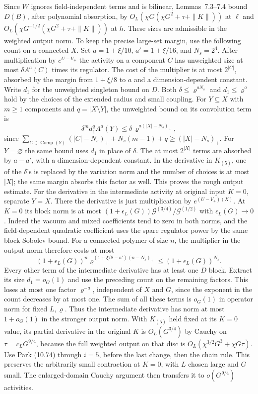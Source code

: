 \documentclass[11pt]{article}
\begin{document}
Since \(W\) ignores field-independent terms and is
bilinear, Lemmas~7.3--7.4 bound \(D(B)\), after
polynomial absorption, by
\(O_L(\chi G(\chi G^2+\tau+\|K\|))\) at \(\ell\)
and \(O_L(\chi G^{-1/2}(\chi G^2+\tau+\|K\|))\)
at \(h\). These sizes are admissible in the weighted output
norm. To keep the precise large-set margin, use the
following count on a connected \(X\). Set
\(a=1+\xi/10\), \(a'=1+\xi/16\), and \(N_s=2^4\).
After multiplication by \(e^{U-V_+}\) the activity
on a component \(C\) has unweighted size at most
\(\delta A^a(C)\) times its regulator. The cost of the
multiplier is at most \(2^{|C|}\), absorbed by the
margin from \(1+\xi/8\) to \(a\) and a dimension-dependent
constant. Write \(d_1\) for the unweighted singleton
bound on \(D\). Both \(\delta\le\varrho^{aN_s}\) and
\(d_1\le\varrho^a\) hold by the choices of the extended
radius and small coupling. For \(Y\subseteq X\) with
\(m\ge1\) components and \(q=|X\setminus Y|\), the
unweighted bound on its convolution term is
\[
 \delta^m d_1^q A^a(Y)
 \le \delta\,\varrho^{a(|X|-N_s)_+},
\]
since \(\sum_{C\in\operatorname{Comp}(Y)}(|C|-N_s)_+
  +N_s(m-1)+q\ge (|X|-N_s)_+\).
For \(Y=\varnothing\) the same bound uses \(d_1\) in
place of \(\delta\). The at most \(2^{|X|}\) terms are
absorbed by \(a-a'\), with a dimension-dependent
constant. In the derivative in \(K_{(5)}\), one of the
\(\delta\)'s is replaced by the variation norm and the
number of choices is at most \(|X|\); the same margin
absorbs this factor as well. This proves the rough
output estimate. For the derivative in the intermediate
activity at original input \(K=0\), separate \(Y=X\).
There the derivative is just multiplication by
\(e^{(U-V_+)(X)}\). At \(K=0\) its block norm is at most
\((1+\epsilon_L(G))\mathcal G^{(3/4)}/\mathcal G^{(1/2)}\)
with \(\epsilon_L(G)\to0\). Indeed the vacuum and mixed
coefficients tend to zero in both norms, and the
field-dependent quadratic coefficient uses the spare
regulator power by the same block Sobolev bound. For a
connected polymer of size \(n\), the multiplier in the
output norm therefore costs at most
\[
 (1+\epsilon_L(G))^n
    \varrho^{(1+\xi/8-a')(n-N_s)_+}
 \le (1+\epsilon_L(G))^{N_s}.
\]
Every other term of the intermediate derivative has
at least one \(D\) block. Extract its size \(d_1=o_G(1)\)
and use the preceding count on the remaining factors.
This loses at most one factor \(\varrho^{-a}\),
independent of \(X\) and \(G\), since the exponent in
the count decreases by at most one. The sum of all
these terms is \(o_G(1)\) in operator norm for fixed
\(L,\varrho\). Thus the intermediate derivative has
norm at most \(1+o_G(1)\) in the stronger output norm.
With \(K_{(5)}\) held
fixed at its \(K=0\) value, its partial derivative in the
original \(K\) is \(O_L(G^{3/4})\) by Cauchy on
\(\tau=c_LG^{9/4}\), because the full weighted output
on that disc is
\(O_L(\chi^{3/2}G^3+\chi G\tau)\).
Use Park (10.74) through \(i=5\), before the last change,
then the chain rule. This preserves the arbitrarily
small contraction at \(K=0\), with \(L\) chosen large
and \(G\) small. The enlarged-domain Cauchy argument
then transfers it to \(o(G^{9/4})\) activities.
\end{document}
